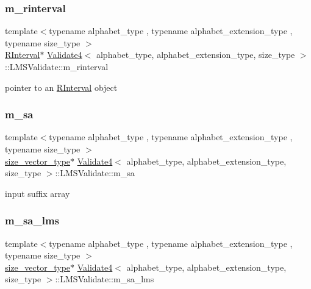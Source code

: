 \subsubsection{\texorpdfstring{m\+\_\+rinterval}{m\_rinterval}}
{\footnotesize\ttfamily template$<$typename alphabet\+\_\+type , typename alphabet\+\_\+extension\+\_\+type , typename size\+\_\+type $>$ \\
\hyperlink{struct_validate4_1_1_l_m_s_validate_1_1_r_interval}{R\+Interval}$\ast$ \hyperlink{class_validate4}{Validate4}$<$ alphabet\+\_\+type, alphabet\+\_\+extension\+\_\+type, size\+\_\+type $>$\+::L\+M\+S\+Validate\+::m\+\_\+rinterval\hspace{0.3cm}{\ttfamily [private]}}



pointer to an \hyperlink{struct_validate4_1_1_l_m_s_validate_1_1_r_interval}{R\+Interval} object 

\mbox{\label{struct_validate4_1_1_l_m_s_validate_ab1f06c75524fdc58a13bdc865c107a3b}} 
\subsubsection{\texorpdfstring{m\+\_\+sa}{m\_sa}}
{\footnotesize\ttfamily template$<$typename alphabet\+\_\+type , typename alphabet\+\_\+extension\+\_\+type , typename size\+\_\+type $>$ \\
\hyperlink{class_validate4_a46ea31a0a4b23f583806792160421d15}{size\+\_\+vector\+\_\+type}$\ast$ \hyperlink{class_validate4}{Validate4}$<$ alphabet\+\_\+type, alphabet\+\_\+extension\+\_\+type, size\+\_\+type $>$\+::L\+M\+S\+Validate\+::m\+\_\+sa\hspace{0.3cm}{\ttfamily [private]}}



input suffix array 

\mbox{\label{struct_validate4_1_1_l_m_s_validate_a789edc9840b1d8af636e4f07127ac333}} 
\subsubsection{\texorpdfstring{m\+\_\+sa\+\_\+lms}{m\_sa\_lms}}
{\footnotesize\ttfamily template$<$typename alphabet\+\_\+type , typename alphabet\+\_\+extension\+\_\+type , typename size\+\_\+type $>$ \\
\hyperlink{class_validate4_a46ea31a0a4b23f583806792160421d15}{size\+\_\+vector\+\_\+type}$\ast$ \hyperlink{class_validate4}{Validate4}$<$ alphabet\+\_\+type, alphabet\+\_\+extension\+\_\+type, size\+\_\+type $>$\+::L\+M\+S\+Validate\+::m\+\_\+sa\+\_\+lms\hspace{0.3cm}{\ttfamily [private]}}



